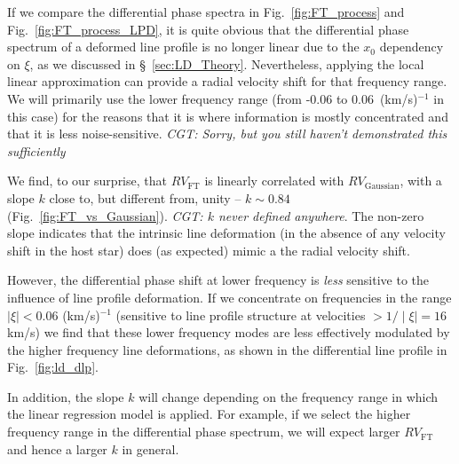 If we compare the differential phase spectra in Fig.~\ref{fig:FT_process} and Fig.~\ref{fig:FT_process_LPD},
it is quite obvious that the differential phase spectrum of a deformed line profile is no longer linear 
due to the $x_0$ dependency on $\xi$, as we discussed in \S~\ref{sec:LD_Theory}. Nevertheless, applying the 
local linear approximation can provide a radial velocity shift for that frequency range. We will primarily 
use the lower frequency range (from -0.06 to 0.06~(km/s)$^{-1}$ in this case) for the reasons that 
it is where information is mostly concentrated and that it is less noise-sensitive. {\em CGT: Sorry, 
but you still haven't demonstrated this sufficiently}

We find, to our surprise, that $RV_\text{FT}$ is linearly correlated with $RV_\text{Gaussian}$, 
with a slope $k$ close to, but different from, unity -- $k \sim 0.84$ (Fig.~\ref{fig:FT_vs_Gaussian}). 
{\em CGT: $k$ never defined anywhere}.
The non-zero slope indicates that the intrinsic line deformation (in the absence of
any velocity shift in the host star) does (as expected) mimic a the radial velocity shift.

However, the differential phase shift at lower frequency is {\em less} sensitive to the
influence of line profile deformation. 
If we concentrate on frequencies in the range $\mid\xi\mid < 0.06$ (km/s)$^{-1}$ (sensitive to line profile
structure at  velocities $> 1/\mid\xi\mid = 16$ km/s) we find that these lower frequency modes are
less effectively modulated by the higher frequency line deformations, as shown in the 
differential line profile in Fig.~\ref{fig:ld_dlp}. 

In addition, the slope $k$ will change depending on the 
frequency range in which the linear regression model is applied. 
For example, if we select the higher frequency range in the differential phase spectrum, we will 
expect larger $RV_\text{FT}$ and hence a larger $k$ in general. 

